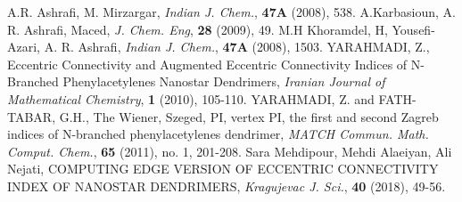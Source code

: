 \documentclass[12pt]{article}
\theoremstyle{theorem}
\theoremstyle{defi}
\begin{document}
\begin{thebibliography}{99}
A.R. Ashrafi, M. Mirzargar, {\it Indian J. Chem.}, {\bf 47A} (2008), 538.
A.Karbasioun, A. R. Ashrafi, Maced, {\it J. Chem. Eng}, {\bf 28} (2009), 49. 
M.H Khoramdel, H, Yousefi-Azari, A. R. Ashrafi, {\it Indian J. Chem.}, {\bf 47A} (2008), 1503. 
YARAHMADI, Z., Eccentric Connectivity and Augmented Eccentric Connectivity Indices of N-Branched Phenylacetylenes Nanostar Dendrimers, {\it Iranian Journal of Mathematical Chemistry}, {\bf 1} (2010), 105-110. 
YARAHMADI, Z. and FATH-TABAR, G.H., The Wiener, Szeged, PI, vertex PI, the first and second Zagreb indices of N-branched phenylacetylenes dendrimer, {\it MATCH Commun. Math. Comput. Chem.}, {\bf 65} (2011), no. 1, 201-208. 
 Sara Mehdipour, Mehdi Alaeiyan, Ali Nejati, COMPUTING EDGE VERSION OF ECCENTRIC CONNECTIVITY INDEX OF NANOSTAR DENDRIMERS, {\it Kragujevac J. Sci.}, {\bf 40} (2018), 49-56.





\end{thebibliography}
\end{document}
